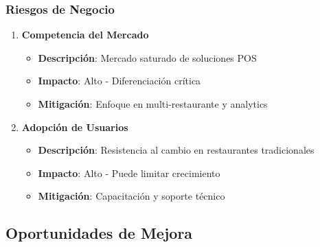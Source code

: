 \documentclass[12pt,a4paper]{article}
\begin{document}
\subsubsection{Riesgos de Negocio}
\begin{enumerate}
    \item \textbf{Competencia del Mercado}
    \begin{itemize}
        \item \textbf{Descripción}: Mercado saturado de soluciones POS
        \item \textbf{Impacto}: Alto - Diferenciación crítica
        \item \textbf{Mitigación}: Enfoque en multi-restaurante y analytics
    \end{itemize}
    
    \item \textbf{Adopción de Usuarios}
    \begin{itemize}
        \item \textbf{Descripción}: Resistencia al cambio en restaurantes tradicionales
        \item \textbf{Impacto}: Alto - Puede limitar crecimiento
        \item \textbf{Mitigación}: Capacitación y soporte técnico
    \end{itemize}
\end{enumerate}

\subsection{Oportunidades de Mejora}
\end{document}
